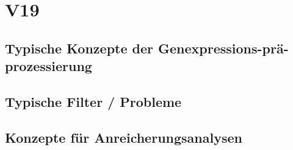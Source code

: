\section{V19}
\subsection{Typische Konzepte der Genexpressions-prä-prozessierung}

\subsection{Typische Filter / Probleme}

\subsection{Konzepte für Anreicherungsanalysen}